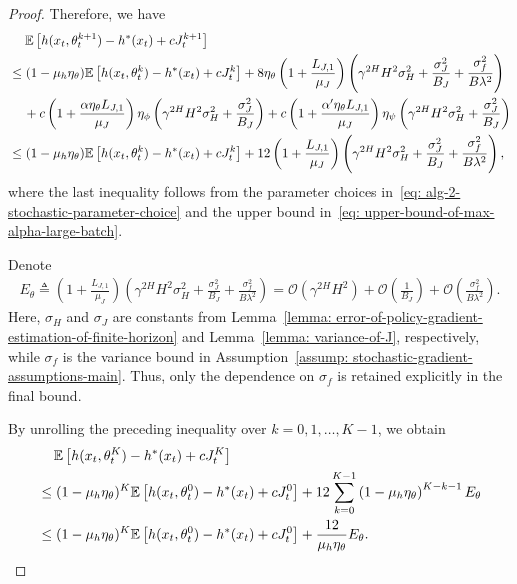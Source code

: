 \documentclass{article}
\theoremstyle{plain}
\theoremstyle{definition}
\theoremstyle{remark}
\def\E{\mathbb E}
\def\cO{\mathcal O}
\def\bydef{\triangleq}
\begin{document}
\begin{proof}
    Therefore, we have
    \begin{align}
        &\quad\; \E \left[ h(x_t,\theta_t^{k+1}) - h^*(x_t) + c J_t^{k+1}\right] \notag \\
        & \leq (1 - \mu_h \eta_\theta) \E \left[h(x_t,\theta_t^{k}) - h^*(x_t)+ c  J_t^k \right] +8 \eta_\theta\left( 1 + \frac{L_{J,1}}{\mu_J}\right) \left( \gamma^{2H} H^2 \sigma_H^2 + \frac{\sigma_J^2}{B_J} +  \frac{\sigma_f^2}{B \lambda^2}\right) \notag \\
        & \quad \, + c \left( 1 +\frac{\alpha \eta_\theta L_{J,1}}{\mu_J} \right) \eta_\phi \left(  \gamma^{2H}H^2 \sigma_H^2 + \frac{\sigma_J^2}{B_{J}} \right) + c \left( 1 +\frac{\alpha' \eta_\theta L_{J,1}}{\mu_J} \right) \eta_\psi \left( \gamma^{2H}H^2 \sigma_H^2 + \frac{\sigma_J^2}{B_{J}} \right) \notag \\
        & \leq  (1 - \mu_h \eta_\theta) \E \left[h(x_t,\theta_t^{k}) - h^*(x_t)+ c  J_t^k \right] + 12 \left(1 + \frac{L_{J,1}}{\mu_J} \right)\left( \gamma^{2H}H^2 \sigma_H^2 + \frac{ \sigma_J^2}{B_{J}} + \frac{ \sigma_f^2}{B\lambda^2} \right)  , 
    \end{align}
    where the last inequality follows from the parameter choices in~\eqref{eq: alg-2-stochastic-parameter-choice} and the upper bound in~\eqref{eq: upper-bound-of-max-alpha-large-batch}.

    Denote 
    \begin{align}
        E_\theta \bydef   \left(1 + \frac{L_{J,1}}{\mu_J} \right)\left( \gamma^{2H}H^2 \sigma_H^2 + \frac{ \sigma_J^2}{B_{J}} + \frac{ \sigma_f^2}{B\lambda^2} \right) = \cO(\gamma^{2H}H^2) + \cO\left(\frac{1}{B_{J}}\right) + \cO\left(\frac{\sigma_f^2}{B\lambda^2}\right). \label{eq: definition-E-theta-large-batch}
    \end{align}
Here, $\sigma_H$ and $\sigma_J$ are constants from
Lemma~\ref{lemma: error-of-policy-gradient-estimation-of-finite-horizon}
and Lemma~\ref{lemma: variance-of-J}, respectively, while $\sigma_f$ is the
variance bound in Assumption~\ref{assump: stochastic-gradient-assumptions-main}.
Thus, only the dependence on $\sigma_f$ is retained explicitly in the final
bound.

By unrolling the preceding inequality over $k=0,1,\ldots,K-1$, we obtain
    \begin{align}
        & \quad\, \E \left[ h(x_t,\theta_t^{K}) - h^*(x_t) + c J_t^{K}\right] \notag \\
        & \leq (1 - \mu_h \eta_\theta)^K \E \left[h(x_t,\theta_t^{0}) - h^*(x_t)+ c  J_t^0 \right] + 12 \sum_{k=0}^{K-1} \left( 1 - \mu_h \eta_\theta\right)^{K-k-1}  E_\theta \notag \\
        & \leq (1 - \mu_h \eta_\theta)^K \E \left[h(x_t,\theta_t^{0}) - h^*(x_t)+ c  J_t^0 \right] + \frac{12}{\mu_h \eta_\theta} E_\theta. \label{eq: recursion-of-h-and-J-large-batch}
    \end{align}


\end{proof}
\end{document}

